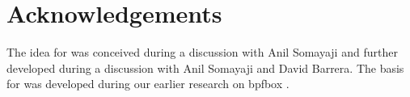\section{Acknowledgements}

The idea for \bpfcontain{} was conceived during a discussion with Anil Somayaji and further developed during a discussion with Anil Somayaji and David Barrera. The basis for \bpfcontain{} was developed during our earlier research on bpfbox \cite{findlay2020_bpfbox}.

